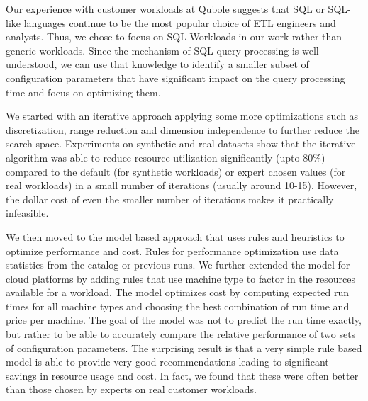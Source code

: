 Our experience with customer workloads at Qubole suggests that SQL or SQL-like languages continue to be the most popular choice of ETL engineers and analysts. Thus, we chose to focus on SQL Workloads in our work rather than generic workloads. Since the mechanism of SQL query processing is well understood, we can use that knowledge to identify a smaller subset of configuration parameters that have significant impact on the query processing time and focus on optimizing them. 


We started with an iterative approach applying some more optimizations such as discretization, range reduction and dimension independence to further reduce the search space. Experiments on synthetic and real datasets show that the iterative algorithm was able to reduce resource utilization significantly (upto 80\%) compared to the default (for synthetic workloads) or expert chosen values (for real workloads) in a small number of iterations (usually around 10-15). However, the dollar cost of even the smaller number of iterations makes it practically infeasible.

We then moved to the model based approach that uses rules and heuristics to optimize performance and cost. Rules for performance optimization use data statistics from the catalog or previous runs. We further extended the model for cloud platforms by adding rules that use machine type to factor in the resources available for a workload. The model optimizes cost by computing expected run times for all machine types and choosing the best combination of run time and price per machine. The goal of the model was not to predict the run time exactly, but rather to be able to accurately compare the relative performance of two sets of configuration parameters. The surprising result is that a very simple rule based model is able to provide very good recommendations leading to significant savings in resource usage and cost. In fact, we found that these were often better than those chosen by experts on real customer workloads.


